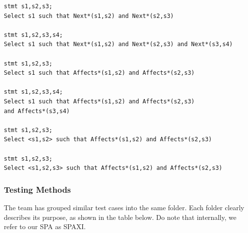 \documentclass[12pt]{article}
\begin{document}
{{{{{{{{{{{{{\begin{verbatim}
stmt s1,s2,s3;
Select s1 such that Next*(s1,s2) and Next*(s2,s3)

stmt s1,s2,s3,s4;
Select s1 such that Next*(s1,s2) and Next*(s2,s3) and Next*(s3,s4)

stmt s1,s2,s3;
Select s1 such that Affects*(s1,s2) and Affects*(s2,s3)

stmt s1,s2,s3,s4;
Select s1 such that Affects*(s1,s2) and Affects*(s2,s3) 
and Affects*(s3,s4)

stmt s1,s2,s3;
Select <s1,s2> such that Affects*(s1,s2) and Affects*(s2,s3)

stmt s1,s2,s3;
Select <s1,s2,s3> such that Affects*(s1,s2) and Affects*(s2,s3)

\end{verbatim}

\subsubsection{Testing Methods}
The team has grouped similar test cases into the same folder. Each folder clearly describes its purpose, as shown in the table below. Do note that internally, we refer to our SPA as SPAXI.

}}}}}}}}}}}}}
\end{document}
